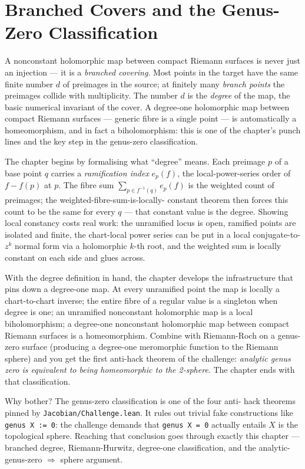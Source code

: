 \section{Branched Covers and the Genus-Zero Classification}
\label{sec:branched-covers-genus-zero}

\begin{layman}
A nonconstant holomorphic map between compact Riemann surfaces is
never just an injection --- it is a \emph{branched covering}. Most
points in the target have the same finite number \(d\) of preimages
in the source; at finitely many \emph{branch points} the preimages
collide with multiplicity. The number \(d\) is the \emph{degree} of
the map, the basic numerical invariant of the cover. A degree-one
holomorphic map between compact Riemann surfaces --- generic fibre is
a single point --- is automatically a homeomorphism, and in fact a
biholomorphism: this is one of the chapter's punch lines and the
key step in the genus-zero classification.

The chapter begins by formalising what ``degree'' means. Each
preimage \(p\) of a base point \(q\) carries a \emph{ramification
index} \(e_p(f)\), the local-power-series order of \(f - f(p)\) at
\(p\). The fibre sum \(\sum_{p \in f^{-1}(q)} e_p(f)\) is the
weighted count of preimages; the weighted-fibre-sum-is-locally-
constant theorem then forces this count to be the same for every
\(q\) --- that constant value is the degree. Showing local constancy
costs real work: the unramified locus is open, ramified points are
isolated and finite, the chart-local power series can be put in a
local conjugate-to-\(z^k\) normal form via a holomorphic \(k\)-th
root, and the weighted sum is locally constant on each side and
glues across.

With the degree definition in hand, the chapter develops the
infrastructure that pins down a degree-one map. At every unramified
point the map is locally a chart-to-chart inverse; the entire fibre
of a regular value is a singleton when degree is one; an unramified
nonconstant holomorphic map is a local biholomorphism; a degree-one
nonconstant holomorphic map between compact Riemann surfaces is a
homeomorphism. Combine with Riemann-Roch on a genus-zero surface
(producing a degree-one meromorphic function to the Riemann sphere)
and you get the first anti-hack theorem of the challenge:
\emph{analytic genus zero is equivalent to being homeomorphic to
the 2-sphere}. The chapter ends with that classification.

Why bother? The genus-zero classification is one of the four anti-
hack theorems pinned by \texttt{Jacobian/Challenge.lean}. It rules
out trivial fake constructions like \texttt{genus X := 0}: the
challenge demands that \texttt{genus X = 0} actually entails \(X\)
is the topological sphere. Reaching that conclusion goes through
exactly this chapter --- branched degree, Riemann-Hurwitz, degree-one
classification, and the analytic-genus-zero \(\Rightarrow\)
sphere argument.
\end{layman}


